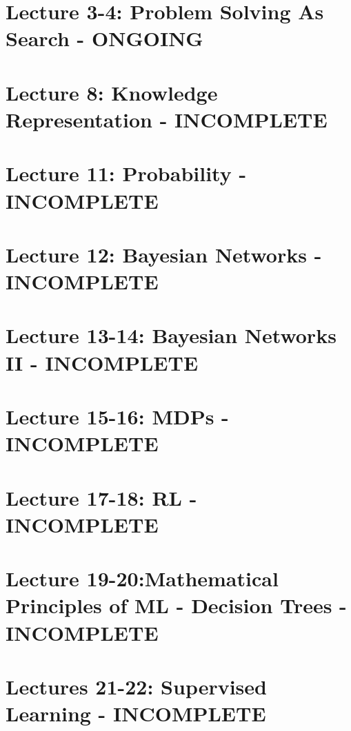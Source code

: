 \documentclass[11pt, oneside]{article}   	%
\begin{document}
\section{Lecture 3-4: Problem Solving As Search - ONGOING}

\section{Lecture 8: Knowledge Representation - INCOMPLETE}
\section{Lecture 11: Probability - INCOMPLETE}
\section{Lecture 12: Bayesian Networks - INCOMPLETE}
\section{Lecture 13-14: Bayesian Networks II - INCOMPLETE}
\section{Lecture 15-16: MDPs - INCOMPLETE}
\section{Lecture 17-18: RL - INCOMPLETE}
\section{Lecture 19-20:Mathematical Principles of ML - Decision Trees - INCOMPLETE}
\section{Lectures 21-22: Supervised Learning - INCOMPLETE}
\end{document}
